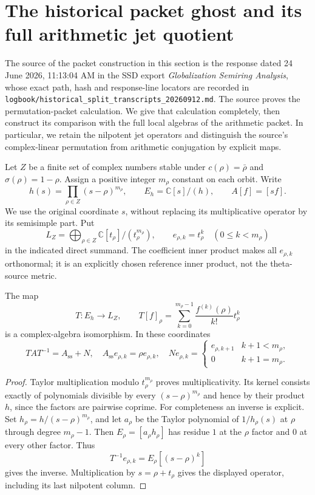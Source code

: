 \section{The historical packet ghost and its full arithmetic jet quotient}
\label{sec:historical-packet-ghost}

The source of the packet construction in this section is the response dated
24 June 2026, 11:13:04 AM in the SSD export \emph{Globalization Semiring
Analysis}, whose exact path, hash and response-line locators are recorded in
\texttt{logbook/historical\_split\_transcripts\_20260912.md}.  The source proves
the permutation-packet calculation.  We give that calculation completely,
then construct its comparison with the full local algebras of the arithmetic
packet.  In particular, we retain the nilpotent jet operators and distinguish
the source's complex-linear permutation from arithmetic conjugation by
explicit maps.

Let $Z$ be a finite set of complex numbers stable under
$c(\rho)=\bar\rho$ and $\sigma(\rho)=1-\rho$.  Assign a positive integer
$m_\rho$ constant on each orbit.  Write
\[
 h(s)=\prod_{\rho\in Z}(s-\rho)^{m_\rho},\qquad
 E_h=\mathbb C[s]/(h),\qquad A[f]=[sf].
\]
We use the original coordinate $s$, without replacing its multiplicative
operator by its semisimple part.  Put
\[
 L_Z=\bigoplus_{\rho\in Z}\mathbb C[t_\rho]/(t_\rho^{m_\rho}),
 \qquad e_{\rho,k}=t_\rho^k\quad(0\leq k<m_\rho)
\]
in the indicated direct summand.  The coefficient inner product makes all
$e_{\rho,k}$ orthonormal; it is an explicitly chosen reference inner product,
not the theta-source metric.

\begin{proposition}
\label{prop:ghost-crt}
The map
\[
 T:E_h\longrightarrow L_Z,\qquad
 T[f]_\rho=\sum_{k=0}^{m_\rho-1}
             \frac{f^{(k)}(\rho)}{k!}t_\rho^k
\]
is a complex-algebra isomorphism.  In these coordinates
\[
 TAT^{-1}=A_{\mathrm{ss}}+N,\quad
 A_{\mathrm{ss}}e_{\rho,k}=\rho e_{\rho,k},\quad
 Ne_{\rho,k}=\begin{cases}e_{\rho,k+1}&k+1<m_\rho,\\0&k+1=m_\rho.
 \end{cases}
\]
\end{proposition}
\begin{proof}
Taylor multiplication modulo $t_\rho^{m_\rho}$ proves multiplicativity.
Its kernel consists exactly of polynomials divisible by every
$(s-\rho)^{m_\rho}$ and hence by their product $h$, since the factors are
pairwise coprime.  For completeness an inverse is explicit.  Set
$h_\rho=h/(s-\rho)^{m_\rho}$, and let $a_\rho$ be the Taylor polynomial
of $1/h_\rho(s)$ at $\rho$ through degree $m_\rho-1$.  Then
$E_\rho=[a_\rho h_\rho]$ has residue $1$ at the $\rho$ factor and $0$
at every other factor.  Thus
\[
 T^{-1}e_{\rho,k}=E_\rho[(s-\rho)^k]
\]
gives the inverse.  Multiplication by $s=\rho+t_\rho$ gives the displayed
operator, including its last nilpotent column.
\end{proof}

